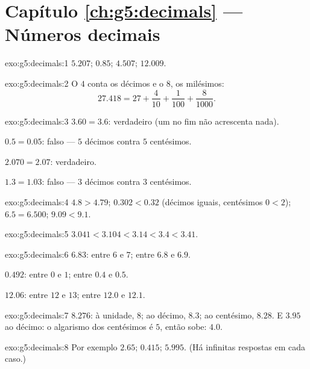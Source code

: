 \section*{Capítulo \ref{ch:g5:decimals} --- Números decimais}

\begin{solution}{exo:g5:decimals:1}
$5.207$; \quad $0.85$; \quad $4.507$; \quad $12.009$.
\end{solution}

\begin{solution}{exo:g5:decimals:2}
O $4$ conta os décimos e o $8$, os milésimos:
\[
27.418 = 27 + \frac{4}{10} + \frac{1}{100} + \frac{8}{1000}.
\]
\end{solution}

\begin{solution}{exo:g5:decimals:3}
$3.60 = 3.6$: verdadeiro (um  no fim não acrescenta nada).

$0.5 = 0.05$: falso --- $5$ décimos contra $5$ centésimos.

$2.070 = 2.07$: verdadeiro.

$1.3 = 1.03$: falso --- $3$ décimos contra $3$ centésimos.
\end{solution}

\begin{solution}{exo:g5:decimals:4}
$4.8 > 4.79$; \quad $0.302 < 0.32$ (décimos iguais, centésimos
$0 < 2$); \quad $6.5 = 6.500$; \quad $9.09 < 9.1$.
\end{solution}

\begin{solution}{exo:g5:decimals:5}
$3.041 < 3.104 < 3.14 < 3.4 < 3.41$.
\end{solution}

\begin{solution}{exo:g5:decimals:6}
$6.83$: entre $6$ e $7$; entre $6.8$ e $6.9$.

$0.492$: entre $0$ e $1$; entre $0.4$ e $0.5$.

$12.06$: entre $12$ e $13$; entre $12.0$ e $12.1$.
\end{solution}

\begin{solution}{exo:g5:decimals:7}
$8.276$: à unidade, $8$; ao décimo, $8.3$; ao centésimo, $8.28$. E
$3.95$ ao décimo: o algarismo dos centésimos é $5$, então sobe:
$4.0$.
\end{solution}

\begin{solution}{exo:g5:decimals:8}
Por exemplo $2.65$; \quad $0.415$; \quad $5.995$. (Há infinitas
respostas em cada caso.)
\end{solution}


